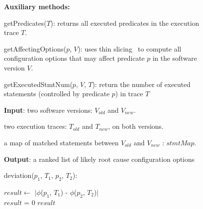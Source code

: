 
\begin{figure}[t]
\textbf{Auxiliary methods:}

\quad getPredicates($\mathit{T}$): returns all executed predicates in the execution trace $\mathit{T}$.

\quad getAffectingOptions($\mathit{p}$, $\mathit{V}$): uses thin slicing~\cite{Sridharan:2007} to compute all configuration options that may affect predicate $\mathit{p}$ in the software version $\mathit{V}$. 

\quad getExecutedStmtNum($\mathit{p}$, $\mathit{V}$, $\mathit{T}$): return the number of executed statements (controlled by predicate $\mathit{p}$) in trace $\mathit{T}$

\textbf{Input}: two software versions: $\mathit{V_{old}}$ and $\mathit{V_{new}}$. 

\quad two execution traces: $\mathit{T_{old}}$ and $\mathit{T_{new}}$, on both versions.

\quad a map of matched statements between $\mathit{V_{old}}$ and $\mathit{V_{new}}$ : $\mathit{stmtMap}$.

\textbf{Output}: {a ranked list of likely root cause configuration options}

\vspace{1mm}

deviation($\mathit{p_{1}}$, $\mathit{T_1}$, $\mathit{p_{2}}$, $\mathit{T_2}$):\\
\vspace{-4mm}%
\begin{algorithmic}[1]
\STATE $\mathit{result} \leftarrow$ $|$$\phi$($\mathit{p_{1}}$, $\mathit{T_1}$) - $\phi$($\mathit{p_{2}}$, $\mathit{T_2}$)$|$\\
\STATE $\mathit{result}$ = 0
\ENDIF
\RETURN $\mathit{result}$
\end{algorithmic}


\end{figure}
